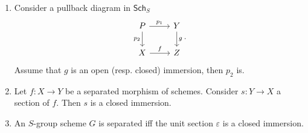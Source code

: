 \documentclass[../Main]{subfiles}
\begin{document}
\begin{prop}[]\leavevmode\vspace{-.2\baselineskip}
	\begin{enumerate}
		\item 
	Consider a pullback diagram in $\mathsf{Sch}_{ S }$
	\begin{equation}
	\begin{tikzcd}
		P \arrow[r, "p_1", rightarrow] \arrow[d, "p_2"', rightarrow] &
		Y \arrow[d, "g", rightarrow] \\
		X \arrow[r, "f", rightarrow] &
		Z
	\end{tikzcd}
	.\end{equation} 
	Assume that $g$ is an open (resp. closed) immersion, then $p_2$ is.
	\item Let $f\colon X \to Y$ be a separated morphism of schemes.
		Consider $s\colon Y \to X$ a section of $f$.
		Then $s$ is a closed immersion.
	\item An $S$-group scheme $G$ is separated iff the unit section $\varepsilon$
		is a closed immersion.
	\end{enumerate}
\end{prop}
\end{document}
